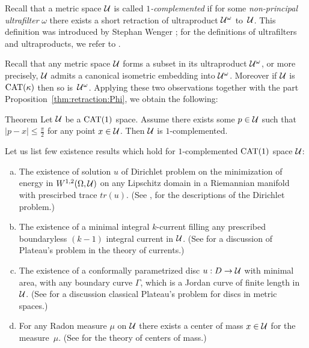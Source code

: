 \documentclass[oneside,a4paper, 12pt]{article}
\begin{document}
Recall that a metric space ${\mathcal{U}}$ is called \emph{$1$-complemented} if for some \emph{non-principal ultrafilter} $\omega$  there exists a short retraction of ultraproduct ${\mathcal{U}}^{\omega}$ to~${\mathcal{U}}$.
This definition was introduced by Stephan Wenger \cite{Wenger-1comp};
for the definitions of ultrafilters and ultraproducts, we refer to \cite{Wenger-1comp,Wenger-2comp,akp}. 

Recall that any metric space ${\mathcal{U}}$ forms a subset in its ultraproduct ${\mathcal{U}}^{\omega}$, or more precisely, ${\mathcal{U}}$ admits a canonical isometric embedding into ${\mathcal{U}}^{\omega}$.
Moreover if ${\mathcal{U}}$ is $\mathrm{CAT}(\kappa)$ then so is~${\mathcal{U}}^\omega$. 
Applying these two observations together with the part Proposition~\ref{thm:retraction:Phi}, we obtain  the following:

\begin{thm}{Theorem}\label{thm:complemented}
Let ${\mathcal{U}}$ be  a $\mathrm{CAT}(1)$ space.
Assume  there exists some $p\in {\mathcal{U}}$ such that $|p-x|\le \tfrac\pi2$ for any point $x\in {\mathcal{U}}$.
Then ${\mathcal{U}}$ is $1$-complemented.
\end{thm}

Let us list few existence results which hold for $1$-complemented $\mathrm{CAT}(1)$ %
space ${\mathcal{U}}$:
\begin{enumerate}[(a)]
\item\label{dirichlet}   The existence of solution $u$ of Dirichlet problem on the minimization of energy 
in $W^{1,2} (\Omega, {\mathcal{U}})$ on any Lipschitz domain in a Riemannian manifold with prescirbed trace $tr(u)$.
(See \cite{KS,Guo}, 
for the descriptions of the Dirichlet problem.)
\item The existence of a minimal integral $k$-current filling any prescribed boundaryless $(k-1)$ integral current in ${\mathcal{U}}$. 
(See \cite{Ambrosio,Wenger-1comp} for a discussion of Plateau's problem in  the theory of currents.)
\item   The existence of a conformally parametrized disc $u:D\to {\mathcal{U}}$ with minimal area, with any  boundary curve $\Gamma$, which is a Jordan curve of finite length in ${\mathcal{U}}$.
(See \cite{LWplateau, Wenger-2comp} for a discussion classical Plateau's problem for discs in metric spaces.)
\item\label{center} For any Radon measure $\mu$ on ${\mathcal{U}}$ there exists a center of mass $x\in {\mathcal{U}}$ for the measure~$\mu$. (See \cite{Sturm, Yokota} for the theory of centers of mass.)
\end{enumerate}
\end{document}
